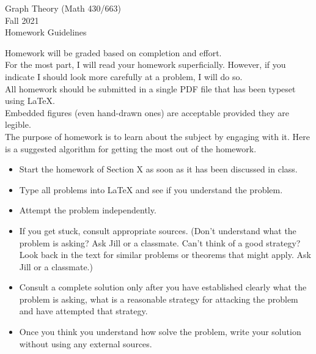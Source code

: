 \documentclass[11pt]{article}
\begin{document}
\begin{center}Graph Theory (Math 430/663)  \\ Fall 2021 \\ Homework Guidelines
\end{center}
\hrulefill

Homework will be graded based on completion and effort. \\

For the most part, I will read your homework superficially. However, if you indicate I should look more carefully at a problem, I will do so.\\

All homework should be submitted in a single PDF file that has been typeset using \LaTeX. \\

Embedded figures (even hand-drawn ones) are acceptable provided they are legible.\\

The purpose of homework is to learn about the subject by engaging with it. Here is a suggested algorithm for getting the most out of the homework.

\begin{itemize}
\item Start the homework of Section X as soon as it has been discussed in class.
\item Type all problems into \LaTeX \: and see if you understand the problem.
\item Attempt the problem independently.
\item If you get stuck, consult appropriate sources. (Don't understand what the problem is asking? Ask Jill or a classmate. Can't think of a good strategy? Look back in the text for similar problems or theorems that might apply. Ask Jill or a classmate.)
\item Consult a complete solution only after you have established clearly what the problem is asking, what is a reasonable strategy for attacking the problem and have attempted that strategy.
\item Once you think you understand how solve the problem, write your solution without using any external sources.
\end{itemize}
\end{document}
